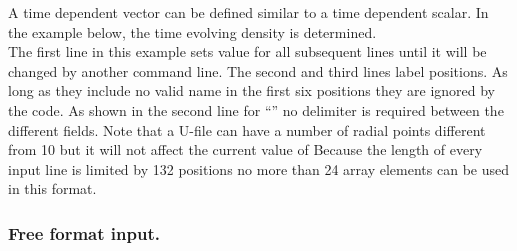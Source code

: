 A time dependent vector can be defined similar to a time dependent
scalar. 
In the example below, the time evolving density  is determined. 
\bigskip\\
The first line in this example sets value  for all
subsequent lines until it will be changed by another command line. 
The second and third lines label positions.
As long as they include no valid name in the first six positions they
are ignored by the code. 
As shown in the second line for ``'' no delimiter is required 
between the different fields.
Note that a U-file  can have a number of radial points
different from 10 but it will not affect the current value of
Because the length of every input line is limited by 132 positions no
more than 24 array elements can be used in this format.

\subsubsection{Free format input.}

